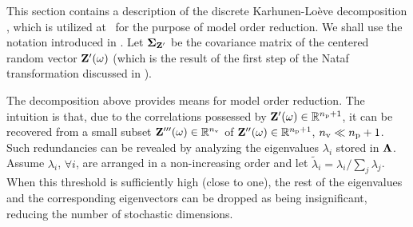 This section contains a description of the discrete Karhunen-Lo\`{e}ve decomposition \cite{ghanem1991}, which is utilized at \ for the purpose of model order reduction.
We shall use the notation introduced in .
Let $\mCov_{\vZ'}$ be the covariance matrix of the centered random vector $\mathbf{Z}'(\omega)$ (which is the result of the first step of the Nataf transformation discussed in ).

The decomposition above provides means for model order reduction.
The intuition is that, due to the correlations possessed by $\mathbf{Z}'(\omega) \in \mathbb{R}^{{n_\text{p}} + 1}$, it can be recovered from a small subset $\mathbf{Z}'''(\omega) \in \mathbb{R}^{n_\text{v}}$ of $\mathbf{Z}''(\omega) \in \mathbb{R}^{{n_\text{p}} + 1}$, ${n_\text{v}} \ll {n_\text{p}} + 1$.
Such redundancies can be revealed by analyzing the eigenvalues $\lambda_i$ stored in $\m{\Lambda}$.
Assume $\lambda_i$, $\forall i$, are arranged in a non-increasing order and let $\tilde{\lambda}_i = \lambda_i / \sum_j \lambda_j$.
When this threshold is sufficiently high (close to one), the rest of the eigenvalues and the corresponding eigenvectors can be dropped as being insignificant, reducing the number of stochastic dimensions.
